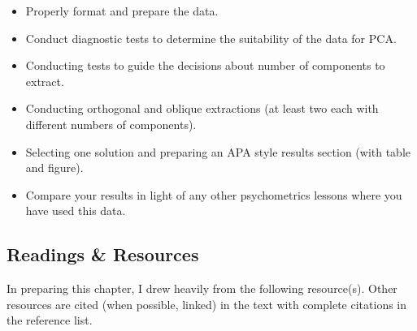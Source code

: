 \documentclass[
  english,
]{book}
\providecommand{\tightlist}{%
  \setlength{\itemsep}{0pt}\setlength{\parskip}{0pt}}
\begin{document}
\begin{itemize}
\tightlist
\item
  Properly format and prepare the data.
\item
  Conduct diagnostic tests to determine the suitability of the data for PCA.
\item
  Conducting tests to guide the decisions about number of components to extract.
\item
  Conducting orthogonal and oblique extractions (at least two each with different numbers of components).
\item
  Selecting one solution and preparing an APA style results section (with table and figure).
\item
  Compare your results in light of any other psychometrics lessons where you have used this data.
\end{itemize}

\hypertarget{readings-resources-6}{%
\subsection{Readings \& Resources}\label{readings-resources-6}}

In preparing this chapter, I drew heavily from the following resource(s). Other resources are cited (when possible, linked) in the text with complete citations in the reference list.
\end{document}

